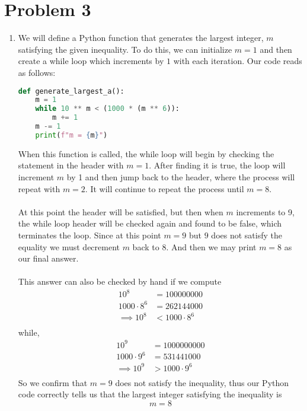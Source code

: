 \documentclass[12pt, letterpaper]{article}
\begin{document}
\section*{Problem 3}
\begin{enumerate}[label=(\alph*)]
    \item We will define a Python function that generates the largest integer, $m$ 
        satisfying the given inequality. To do this, we can initialize $m = 1$ and then create a while loop 
        which increments by $1$ with each iteration. Our code reads as follows: 
\begin{lstlisting}[language = Python]
def generate_largest_a(): 
    m = 1
    while 10 ** m < (1000 * (m ** 6)):
        m += 1
    m -= 1
    print(f"m = {m}") 
\end{lstlisting}
    When this function is called, the while loop will begin by checking the statement in the header
    with $m = 1$. After finding it is true, the loop will increment $m$ by 1 and then jump back to the header, where the process
    will repeat with $m=2$. It will continue to repeat the process until $m=8$. \\ \\At this point the header will be satisfied, but then when $m$ increments
    to 9, the while loop header will be checked again and found to be false, which terminates the loop. Since at this point $m=9$ but $9$ does not satisfy the equality 
    we must decrement $m$ back to 8. And then we may print $m = 8$ as our final answer. \\ \\
    This answer can also be checked by hand if we compute 
    \begin{align*}
        10^8 &= 100000000 \\
        1000 \cdot 8^6 &= 262144000 \\
        \implies 10^8 &< 1000 \cdot 8^6 \\
    \end{align*}
    while, 
    \begin{align*}
        10^9 &= 1000000000 \\
        1000 \cdot 9^6 &= 531441000 \\
        \implies 10^9 &> 1000 \cdot 9^6 \\
    \end{align*}
    So we confirm that $m=9$ does not satisfy the inequality, thus our Python code correctly tells us that 
    the largest integer satisfying the inequality is 
    \[
        m = 8
    \]  


\end{enumerate}
\end{document}

